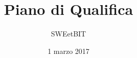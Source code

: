 



\title{\textbf{Piano di Qualifica}}
\author{SWEetBIT}

\date{1 marzo 2017}




\makeFrontPage

\tableofcontents




